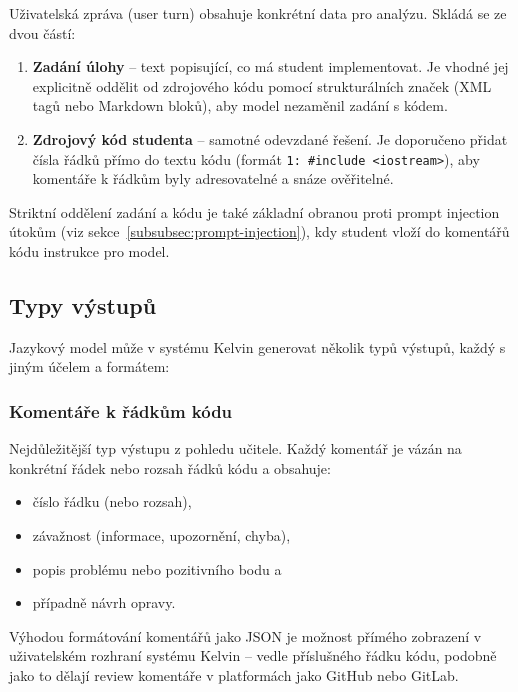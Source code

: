 Uživatelská zpráva (user turn) obsahuje konkrétní data pro analýzu.
Skládá se ze dvou částí:

\begin{enumerate}
    \item \textbf{Zadání úlohy} -- text popisující, co má student implementovat.
    Je vhodné jej explicitně oddělit od zdrojového kódu pomocí strukturálních značek (XML tagů nebo Markdown bloků), aby model nezaměnil zadání s kódem.

    \item \textbf{Zdrojový kód studenta} -- samotné odevzdané řešení.
    Je doporučeno přidat čísla řádků přímo do textu kódu (formát \texttt{1: \#include <iostream>}), aby komentáře k řádkům byly adresovatelné a snáze ověřitelné.
\end{enumerate}

Striktní oddělení zadání a kódu je také základní obranou proti prompt injection útokům (viz sekce~\ref{subsubsec:prompt-injection}), kdy student vloží do komentářů kódu instrukce pro model.

\subsection{Typy výstupů}
\label{subsec:prompts-output-types}

Jazykový model může v systému Kelvin generovat několik typů výstupů, každý s jiným účelem a formátem:

\subsubsection*{Komentáře k řádkům kódu}

Nejdůležitější typ výstupu z pohledu učitele.
Každý komentář je vázán na konkrétní řádek nebo rozsah řádků kódu a obsahuje:
\begin{itemize}
    \item číslo řádku (nebo rozsah),
    \item závažnost (informace, upozornění, chyba),
    \item popis problému nebo pozitivního bodu a
    \item případně návrh opravy.
\end{itemize}

Výhodou formátování komentářů jako JSON je možnost přímého zobrazení v uživatelském rozhraní systému Kelvin -- vedle příslušného řádku kódu, podobně jako to dělají review komentáře v platformách jako GitHub nebo GitLab.

